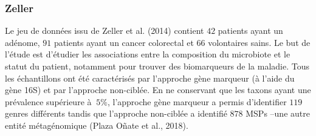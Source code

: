 \documentclass[12pt,a4paper]{reedthesis}
\theoremstyle{definition}
\theoremstyle{definition}
\theoremstyle{definition}
\theoremstyle{remark}
\begin{document}
\hypertarget{zeller}{%
\subsubsection*{Zeller}\label{zeller}}

Le jeu de données issu de Zeller et al. (2014) contient \(42\) patients ayant un adénome, \(91\) patients ayant un cancer colorectal et \(66\) volontaires sains. Le but de l'étude est d'étudier les associations entre la composition du microbiote et le statut du patient, notamment pour trouver des biomarqueurs de la maladie. Tous les échantillons ont été caractérisés par l'approche gène marqueur (à l'aide du gène 16S) et par l'approche non-ciblée. En ne conservant que les taxons ayant une prévalence supérieure à \(~5\%\), l'approche gène marqueur a permis d'identifier \(119\) genres différents tandis que l'approche non-ciblée a identifié \(878\) MSPs --une autre entité métagénomique (Plaza Oñate et al., 2018).
\end{document}
